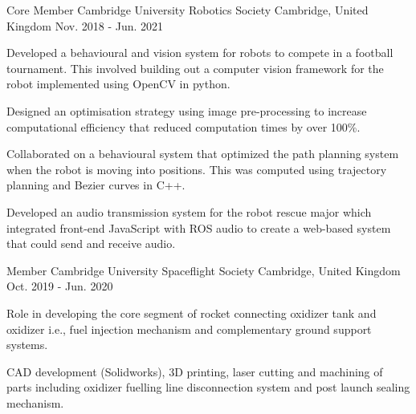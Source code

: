 

\begin{cventries}

  \cventry
    {Core Member} %
    {Cambridge University Robotics Society} %
    {Cambridge, United Kingdom} %
    {Nov. 2018 - Jun. 2021} %
    {
      \begin{cvitems} %
        \item {Developed a behavioural and vision system for robots to compete in a football tournament. This involved building out a computer vision framework for the robot implemented using OpenCV in python.}
        \item {Designed an optimisation strategy using image pre-processing to increase computational efficiency that reduced computation times by over 100\%.}
        \item {Collaborated on a behavioural system that optimized the path planning system when the robot is moving into positions. This was computed using trajectory planning and Bezier curves in C++.}
        \item {Developed an audio transmission system for the robot rescue major which integrated front-end JavaScript with ROS audio to create a web-based system that could send and receive audio.}
      \end{cvitems}
    }

  \cventry
    {Member} %
    {Cambridge University Spaceflight Society} %
    {Cambridge, United Kingdom} %
    {Oct. 2019 - Jun. 2020} %
    {
      \begin{cvitems} %
        \item {Role in developing the core segment of rocket connecting oxidizer tank and oxidizer i.e., fuel injection mechanism and complementary ground support systems.}
        \item {CAD development (Solidworks), 3D printing, laser cutting and machining of parts including oxidizer fuelling line disconnection system and post launch sealing mechanism.}
      \end{cvitems}
    }
\end{cventries}
